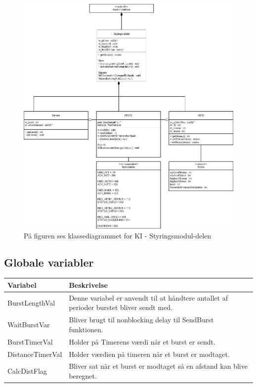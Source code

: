 \begin{figure}[H]
\centering
\includegraphics[width=1\textwidth]{billeder/SM-Class}
\caption{På figuren ses klassediagrammet for KI - Styringsmodul-delen}
\end{figure}

\subsection{Globale variabler}
\begin{table}[H]
\begin{tabular}{|l|p{10cm}|}
\hline
\cellcolor[gray]{0.8}\textbf{Variabel} &\cellcolor[gray]{0.8} \textbf{Beskrivelse}\\ \hline
BurstLengthVal & Denne variabel er anvendt til at håndtere antallet af perioder burstet bliver sendt med.\\ \hline
WaitBurstVar & Bliver brugt til nonblocking delay til SendBurst funktionen.\\ \hline
BurstTimerVal & Holder på Timerens værdi når et burst er sendt.\\ \hline
DistanceTimerVal & Holder værdien på timeren når et burst er modtaget. \\ \hline
CalcDistFlag & Bliver sat når et burst er modtaget så en afstand kan blive beregnet.\\ \hline
\end{tabular}
\end{table}
